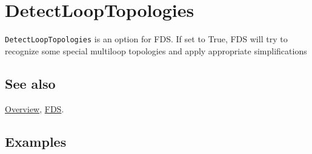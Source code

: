 \documentclass[../FeynCalcManual.tex]{subfiles}
\begin{document}
\hypertarget{detectlooptopologies}{%
\section{DetectLoopTopologies}\label{detectlooptopologies}}

\texttt{DetectLoopTopologies} is an option for FDS. If set to True, FDS
will try to recognize some special multiloop topologies and apply
appropriate simplifications

\subsection{See also}

\hyperlink{toc}{Overview}, \hyperlink{fds}{FDS}.

\subsection{Examples}
\end{document}
